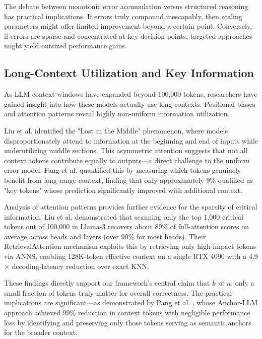 \documentclass{article}
\begin{document}
The debate between monotonic error accumulation versus structured reasoning has practical implications. If errors truly compound inescapably, then scaling parameters might offer limited improvement beyond a certain point. Conversely, if errors are sparse and concentrated at key decision points, targeted approaches might yield outsized performance gains.

\subsection{Long-Context Utilization and Key Information}

As LLM context windows have expanded beyond 100,000 tokens, researchers have gained insight into how these models actually use long contexts. Positional biases and attention patterns reveal highly non-uniform information utilization.

Liu et al. \citep{liu2023lost} identified the "Lost in the Middle" phenomenon, where models disproportionately attend to information at the beginning and end of inputs while underutilizing middle sections. This asymmetric attention suggests that not all context tokens contribute equally to outputs—a direct challenge to the uniform error model. Fang et al. \citep{fang2024what} quantified this by measuring which tokens genuinely benefit from long-range context, finding that only approximately 9\% qualified as "key tokens" whose prediction significantly improved with additional context.

Analysis of attention patterns provides further evidence for the sparsity of critical information. Liu et al. \citep{liu2024retrieval} demonstrated that scanning only the top 1,000 critical tokens out of 100,000 in Llama-3 recovers about 89\% of full-attention scores on average across heads and layers (over 90\% for most heads). Their RetrievalAttention mechanism exploits this by retrieving only high-impact tokens via ANNS, enabling 128K-token effective context on a single RTX 4090 with a 4.9$\times$ decoding-latency reduction over exact KNN.

These findings directly support our framework's central claim that $k \ll n$: only a small fraction of tokens truly matter for overall correctness. The practical implications are significant—as demonstrated by Pang et al. \citep{pang2024anchor}, whose Anchor-LLM approach achieved 99\% reduction in context tokens with negligible performance loss by identifying and preserving only those tokens serving as semantic anchors for the broader context.
\end{document}
